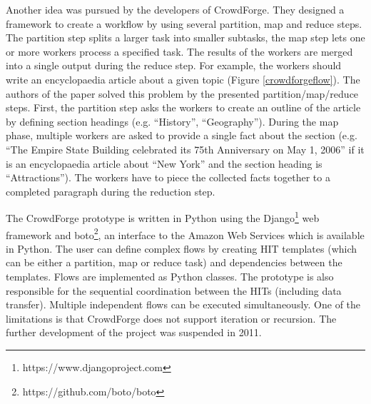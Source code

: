 Another idea was pursued by the developers of CrowdForge\cite{crowdforge}. They designed a framework to create a workflow by using several partition, map and reduce steps. The partition step splits a larger task into smaller subtasks, the map step lets one or more workers process a specified task. The results of the workers are merged into a single output during the reduce step. For example, the workers should write an encyclopaedia article about a given topic (Figure \ref{crowdforgeflow}). The authors of the paper solved this problem by the presented partition/map/reduce steps. First, the partition step asks the workers to create an outline of the article by defining section headings (e.g. ``History'', ``Geography''). During the map phase, multiple workers are asked to provide a single fact about the section (e.g. ``The Empire State Building celebrated its 75th Anniversary on May 1, 2006'' if it is an encyclopaedia article about ``New York'' and the section heading is ``Attractions''). The workers have to piece the collected facts together to a completed paragraph during the reduction step.

The CrowdForge prototype is written in Python using the Django\footnote{https://www.djangoproject.com} web framework and boto\footnote{https://github.com/boto/boto}, an interface to the Amazon Web Services which is available in Python. The user can define complex flows by creating HIT templates (which can be either a partition, map or reduce task) and dependencies between the templates. Flows are implemented as Python classes. The prototype is also responsible for the sequential coordination between the HITs (including data transfer). Multiple independent flows can be executed simultaneously. One of the limitations is that CrowdForge does not support iteration or recursion. The further development of the project was suspended in 2011.

